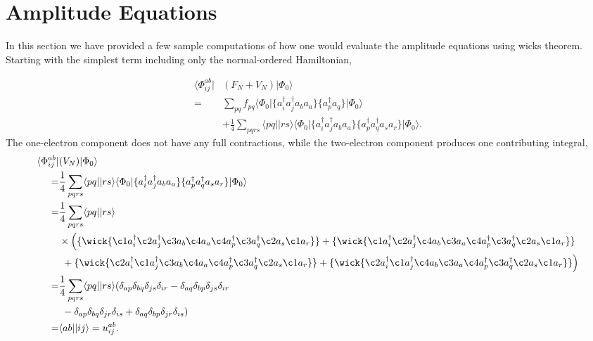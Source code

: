 \documentclass[
    a4paper, aps, twocolumn, floatfix, superscriptaddress,
    nofootinbib]{revtex4-1}
\newcommand{\1}{\mathds{1}}
\newcommand{\bra}[1]{\langle #1\lvert}
\newcommand{\ket}[1]{\rvert #1\rangle}
\begin{document}
\section{Amplitude Equations}

    \label{app:wickOnAmplitude}

    In this section we have provided a few sample computations of how one would
    evaluate the amplitude equations using wicks theorem. Starting with the simplest
    term including only the normal-ordered Hamiltonian,

    \begin{equation}
        \begin{aligned}
            \bra{\Phi_{ij}^{ab}} &(F_N + V_N)\ket{\Phi_0} \\
             =& \sum_{pq}f_{pq}\bra{\Phi_0}\{a_i^\dagger a_j^\dagger a_ba_a\}\{a^\dagger_pa_q\}\ket{\Phi_0} \\
             &+\frac{1}{4}\sum_{pqrs}\bra{pq}\ket{rs}
             \bra{\Phi_0}\{a_i^\dagger a_j^\dagger a_ba_a\}\{a^\dagger_pa^\dagger_qa_sa_r\}\ket{\Phi_0}.
        \end{aligned}
        \end{equation}
        The one-electron component does not have any full contractions, while the
        two-electron component produces one contributing integral,
        \begin{equation}
        \begin{aligned}
            \bra{\Phi_{ij}^{ab}} &(V_N)\ket{\Phi_0} \\
                =& \frac{1}{4}\sum_{pqrs}\bra{pq}\ket{rs}
             \bra{\Phi_0}\{a_i^\dagger a_j^\dagger a_ba_a\}\{a^\dagger_pa^\dagger_qa_sa_r\}\ket{\Phi_0} \\
                 =& \frac{1}{4} \sum_{pqrs} \bra{pq}\ket{rs} \\ &\times\Big(
                     \{ \wick{\c1 a^\dagger_i \c2 a^\dagger_j \c3 a_b \c4 a_a
                     \c4 a^\dagger_p \c3 a^\dagger_q \c2 a_s \c1 a_r}\}
                     +
                     \{ \wick{\c1 a^\dagger_i \c2 a^\dagger_j \c4 a_b \c3 a_a
                     \c4 a^\dagger_p \c3 a^\dagger_q \c2 a_s \c1 a_r}\} \\
                   &\ +
                      \{ \wick{\c2 a^\dagger_i \c1 a^\dagger_j \c3 a_b \c4 a_a
                     \c4 a^\dagger_p \c3 a^\dagger_q \c2 a_s \c1 a_r}\}
                     +
                     \{ \wick{\c2 a^\dagger_i \c1 a^\dagger_j \c4 a_b \c3 a_a
                     \c4 a^\dagger_p \c3 a^\dagger_q \c2 a_s \c1 a_r}\}
                 \Big) \\
                 =&  \frac{1}{4} \sum_{pqrs} \bra{pq}\ket{rs}
                 ( \delta_{ap}\delta_{bq}\delta_{js}\delta_{ir}
                  -\delta_{aq}\delta_{bp}\delta_{js}\delta_{ir} \\
                 &\ -\delta_{ap}\delta_{bq}\delta_{jr}\delta_{is}
                  +\delta_{aq}\delta_{bp}\delta_{jr}\delta_{is}) \\
                  =& \bra{ab}\ket{ij} = u^{ab}_{ij}.
        \end{aligned}
        \end{equation}
\end{document}
